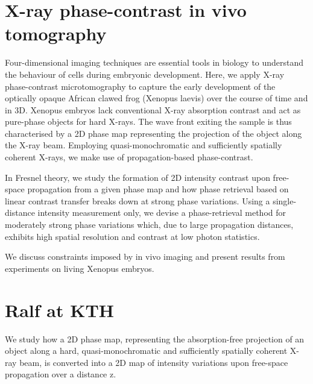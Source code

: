 \documentclass{article}
\begin{document}
\section{X-ray phase-contrast in vivo tomography}


Four-dimensional imaging techniques are essential tools in biology to
understand the behaviour of cells during embryonic development.  Here,
we apply X-ray phase-contrast microtomography to capture the early
development of the optically opaque African clawed frog (Xenopus
laevis) over the course of time and in 3D. Xenopus embryos lack
conventional X-ray absorption contrast and act as pure-phase objects
for hard X-rays.  The wave front exiting the sample is thus
characterised by a 2D phase map representing the projection of the
object along the X-ray beam.  Employing quasi-monochromatic and
sufficiently spatially coherent X-rays, we make use of
propagation-based phase-contrast.

In Fresnel theory, we study the formation of 2D intensity contrast
upon free-space propagation from a given phase map and how phase
retrieval based on linear contrast transfer breaks down at strong
phase variations.  Using a single-distance intensity measurement only,
we devise a phase-retrieval method for moderately strong phase
variations which, due to large propagation distances, exhibits high
spatial resolution and contrast at low photon statistics.

We discuss constraints imposed by in vivo imaging and present results
from experiments on living Xenopus embryos.





\newpage
\section{Ralf at KTH}


We study how a 2D phase map, representing the absorption-free
projection of an object along a hard, quasi-monochromatic and
sufficiently spatially coherent X-ray beam, is converted into a 2D map
of intensity variations upon free-space propagation over a distance z.
\end{document}

